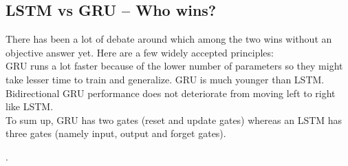 \subsection{LSTM vs GRU – Who wins?}
There has been a lot of debate around which among the two wins without an objective answer yet. Here are a few widely accepted principles:\\
GRU runs a lot faster because of the lower number of parameters so they might take lesser time to train and generalize. GRU is much younger than LSTM. Bidirectional GRU performance does not deteriorate from moving left to right like LSTM.\\
To sum up, GRU has two gates (reset and update gates) whereas an LSTM has three gates (namely input, output and forget gates).



.